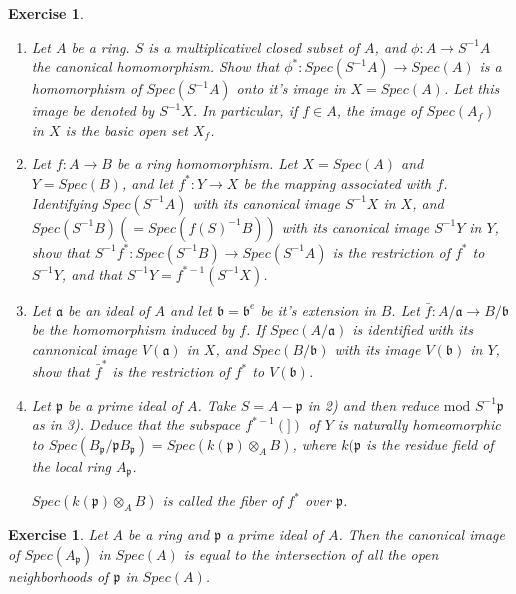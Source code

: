\documentclass[]{report}
\newtheorem{exercise}[theorem]{Exercise}
\begin{document}
\begin{exercise}
    \begin{enumerate}
        \item Let $A$ be a ring. $S$ is a multiplicativel closed subset of $A$, and $\phi: A\rightarrow S^{-1}A$ the canonical homomorphism. Show that $\phi^*: Spec(S^{-1}A) \rightarrow Spec(A)$ is a homomorphism of $Spec(S^{-1}A)$ onto it's image in $X = Spec(A)$. Let this image be denoted by $S^{-1}X$.    
    In particular, if $f\in A$, the image of $Spec(A_f)$ in $X$ is the basic open set $X_f$. 
        \item Let $f:A \rightarrow B$ be a ring homomorphism. Let $X = Spec(A)$ and $Y = Spec(B)$, and let $f^*: Y\rightarrow X$ be the mapping associated with $f$. Identifying $Spec(S^{-1}A)$ with its canonical image $S^{-1}X$ in $X$, and $Spec(S^{-1}B) (= Spec (f(S)^{-1}B))$ with its canonical image $S^{-1}Y$ in $Y$, show that $S^{-1}f^*: Spec(S^{-1}B)\rightarrow Spec(S^{-1}A)$ is the restriction of $f^*$ to $S^{-1}Y$, and that $S^{-1}Y = f^{*-1}(S^{-1}X)$.
        \item Let $\mathfrak{a}$ be an ideal of $A$ and let $\mathfrak{b} = \mathfrak{b}^e$ be it's extension in $B$. Let $\bar{f}:A/\mathfrak{a} \rightarrow B/\mathfrak{b}$ be the homomorphism induced by $f$. If $Spec(A/\mathfrak{a})$ is identified with its cannonical image $V(\mathfrak{a})$ in $X$, and $Spec(B/\mathfrak{b})$ with its image $V(\mathfrak{b})$ in $Y$, show that $\bar{f}^*$ is the restriction of $f^*$ to $V(\mathfrak{b})$.
        \item Let $\mathfrak{p}$ be a prime ideal of $A$. Take $S = A - \mathfrak{p}$ in 2) and then reduce $\text{mod } S^{-1}\mathfrak{p}$ as in 3). Deduce that the subspace $f^{*-1}(\mathfrak{]})$ of $Y$ is naturally homeomorphic to $Spec(B_\mathfrak{p}/\mathfrak{p}B_\mathfrak{p}) = Spec(k(\mathfrak{p}) \otimes_A B)$, where $k(\mathfrak{p}$ is the residue field of the local ring $A_\mathfrak{p}$.

            $Spec(k(\mathfrak{p}) \otimes_A B)$ is called the fiber of $f^*$ over $\mathfrak{p}$. 
    \end{enumerate}
\end{exercise}

\begin{exercise}
    Let $A$ be a ring and $\mathfrak{p}$ a prime ideal of $A$. Then the canonical image of $Spec(A_\mathfrak{p})$ in $Spec(A)$ is equal to the intersection of all the open neighborhoods of $\mathfrak{p}$ in $Spec(A)$. 
\end{exercise}
\end{document}
